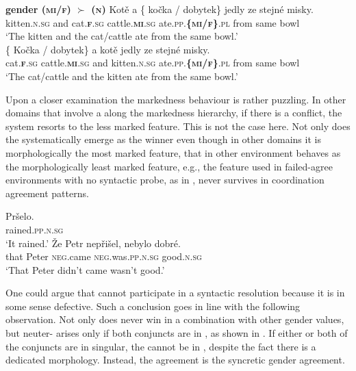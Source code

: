 \documentclass[output=paper,modfontsnewtxmath,hidelinks]{langscibook}
\begin{document}
\ea\label{baseline-inanim} \textbf{gender ({\textsc{mi}/\textsc{f}}) $\succ$  (\textsc{n})}
\ea\gll Kotě a \{\hspace{-2pt} kočka / dobytek\} jedly ze stejné misky.\\
kitten.\textsc{n.sg} and {} cat.\textsc{\textbf{f}.sg} {} cattle.\textsc{\textbf{mi}.sg} ate.\textsc{pp.\textbf{\{mi/f\}}.pl} from same bowl\\
\glt `The kitten and the cat/cattle ate from the same bowl.'\\\hfill {}\smallskip
\ex\gll \{\hspace{-2pt} Kočka / dobytek\} a kotě jedly ze stejné misky.\\
{} cat.\textsc{\textbf{f}.sg} {} cattle.\textsc{\textbf{mi}.sg} and kitten.\textsc{n.sg} ate.\textsc{pp.\textbf{\{mi/f\}}.pl} from same bowl\\
\glt `The cat/cattle and the kitten ate from the same bowl.'\\\hfill {}
\z\z

\noindent Upon a closer examination the markedness behaviour is rather puzzling. In other domains that involve a  along the markedness hierarchy, if there is a conflict, the system resorts to the less marked feature. This is not the case here. Not only does the   systematically emerge as the winner even though in other domains it is morphologically the most marked feature,  that in other environment behaves as the morphologically least marked feature, e.g., the feature used in failed-agree environments with no syntactic probe, as in , never survives in coordination agreement patterns.

\ea\label{def-neuter}
\ea\gll Pršelo.\\
rained.\textsc{pp.n.sg}\\
\glt `It rained.'
\ex\gll Že Petr nepřišel, nebylo dobré.\\
that Peter \textsc{neg}.came \textsc{neg}.was.\textsc{pp.n.sg} good.\textsc{n.sg}\\
\glt `That Peter didn't came wasn't good.'
\z\z

\noindent One could argue that  cannot participate in a syntactic resolution because it is in some sense defective. Such a conclusion goes in line with the following observation. Not only does  never win in a combination with other gender values, but neuter- arises only if both conjuncts are in  , as shown in . If either or both of the conjuncts are in  singular, the  cannot be in  , despite the fact there is a dedicated   morphology. Instead, the agreement is the syncretic gender agreement. 
\end{document}
